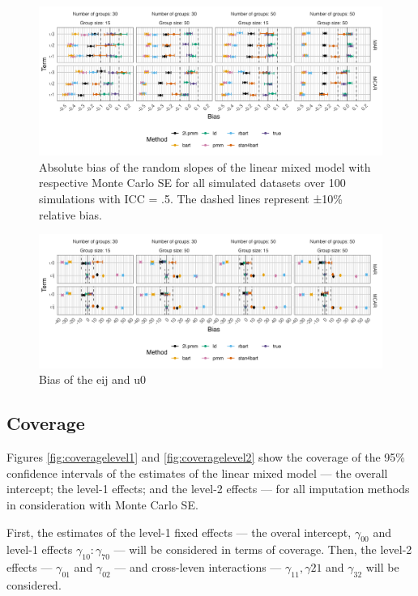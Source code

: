 \documentclass[3p,12pt,a4paper]{elsarticle}
\begin{document}
\begin{figure}[H]
    \centering
    \includegraphics[width=1\textwidth]{biasrandom.png}
    \caption{Absolute bias of the random slopes of the linear mixed model with respective Monte Carlo SE for all simulated datasets over 100 simulations with ICC = .5. The dashed lines represent ±10\% relative bias.}
    \label{fig:biasrandom}
\end{figure}

\begin{figure}[H]
    \centering
    \includegraphics[width=1\textwidth]{bias2.png}
    \caption{Bias of the eij and u0}
    \label{fig:bias2}
\end{figure}

\subsection{Coverage}
Figures \ref{fig:coveragelevel1} and \ref{fig:coveragelevel2} show the coverage of the 95\% confidence intervals of the estimates of the linear mixed model --- the overall intercept; the level-1 effects; and the level-2 effects --- for all imputation methods in consideration with Monte Carlo SE.

First, the estimates of the level-1 fixed effects --- the overal intercept, $\gamma_{00}$ and level-1 effects $\gamma_{10}:\gamma_{70}$ --- will be considered in terms of coverage. Then, the level-2 effects --- $\gamma_{01}$ and $\gamma_{02}$ --- and cross-leven interactions --- $\gamma_{11}, \gamma{21}$ and $\gamma_{32}$ will be considered.
\end{document}
